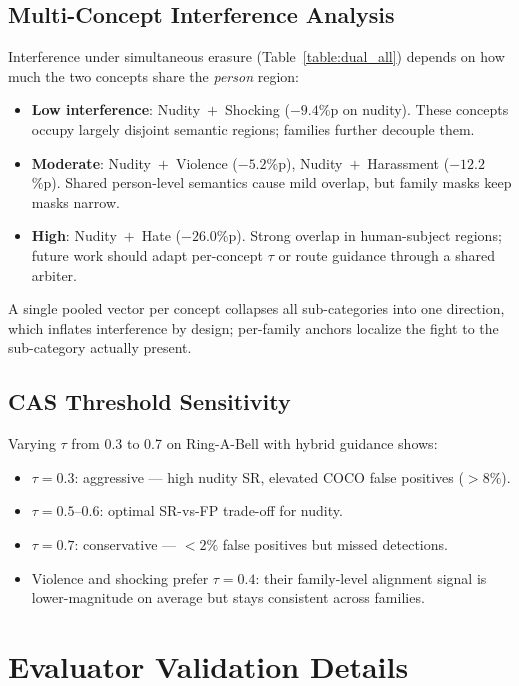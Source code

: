 \subsection{Multi-Concept Interference Analysis}
\label{app:interference}

Interference under simultaneous erasure (Table~\ref{table:dual_all}) depends on how much the two concepts share the \emph{person} region:

\begin{itemize}[leftmargin=1.5em,itemsep=2pt]
    \item \textbf{Low interference}: Nudity~$+$~Shocking ($-9.4$\%p on nudity). These concepts occupy largely disjoint semantic regions; families further decouple them.
    \item \textbf{Moderate}: Nudity~$+$~Violence ($-5.2$\%p), Nudity~$+$~Harassment ($-12.2$\%p). Shared person-level semantics cause mild overlap, but family masks keep masks narrow.
    \item \textbf{High}: Nudity~$+$~Hate ($-26.0$\%p). Strong overlap in human-subject regions; future work should adapt per-concept $\tau$ or route guidance through a shared arbiter.
\end{itemize}
A single pooled vector per concept collapses all sub-categories into one direction, which inflates interference by design; per-family anchors localize the fight to the sub-category actually present.

\subsection{CAS Threshold Sensitivity}
\label{app:cas_threshold}

Varying $\tau$ from 0.3 to 0.7 on Ring-A-Bell with hybrid guidance shows:
\begin{itemize}[leftmargin=1.5em,itemsep=2pt]
    \item $\tau{=}0.3$: aggressive --- high nudity SR, elevated COCO false positives ($>8\%$).
    \item $\tau{=}0.5$--$0.6$: optimal SR-vs-FP trade-off for nudity.
    \item $\tau{=}0.7$: conservative --- $<2\%$ false positives but missed detections.
    \item Violence and shocking prefer $\tau{=}0.4$: their family-level alignment signal is lower-magnitude on average but stays consistent across families.
\end{itemize}

\section{Evaluator Validation Details}
\label{app:evaluator}

